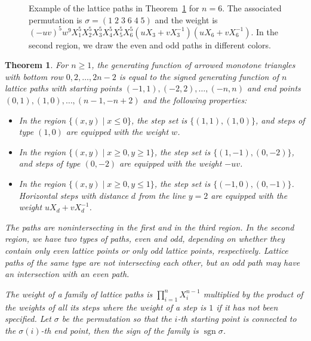 \documentclass[12pt]{amsart}
\newtheorem{theorem}{Theorem}[section]
\theoremstyle{definition}
\numberwithin{equation}{section}
\DeclareMathOperator{\sgn}{sgn}
\begin{document}
\begin{figure}[htb]
	\caption{Example of the lattice paths in Theorem~\ref{interpret1} for $n=6$. The associated permutation is $\sigma = (1\;2\;3\;6\;4\;5)$ and the weight is $(-u v)^5 w^9 \allowbreak X_1^5 X_2^5 X_3^5 X_4^5 X_5^5 X_6^5(u X_3+v X_3^{-1}) (u X_6 + v X_6^{-1})$. In the second region, we draw the even and odd paths in different colors.}
	\label{fig:ExampleFirstInterpretation}
\end{figure}




\begin{theorem} 
\label{interpret1} 
For $n \ge 1$, the generating function of arrowed monotone triangles with bottom row 
$0,2,\ldots,2n-2$ is equal to the signed generating function of $n$ lattice paths with starting points 
$(-1,1),(-2,2),\ldots,(-n,n)$ and end points $(0,1),(1,0),\ldots,(n-1,-n+2)$ and the following properties:
\begin{itemize} 
\item In the region $\{(x,y) \mid x \le 0\}$, the step set is $\{(1,1),(1,0)\}$, and steps of type $(1,0)$ are equipped with the weight $w$. 
\item In the region $\{(x,y) \mid  x \ge 0, y \ge 1\}$, the step set is $\{(1,-1),(0,-2)\}$, and steps of type $(0,-2)$  are equipped with the weight $-uv$. 
\item 
In the region $\{(x,y) \mid  x \ge 0, y \le 1\}$, the step set is $\{(-1,0),(0,-1)\}$. Horizontal steps with distance $d$ from the line $y=2$ are equipped with the weight $u X_d+v X_d^{-1}$. 
\end{itemize} 
The paths are nonintersecting in the first and in the third region. In the second region, we have two types of paths, 
even and odd, depending on whether they contain only even lattice points or only odd lattice points, respectively. Lattice paths of the same type are not intersecting each other, but an odd path may have an intersection with an even path. 

The weight of a family of lattice paths is $\prod_{i=1}^{n} X_i^{n-1}$ multiplied by the product of the weights of all its steps where the weight of a step is $1$ if it has not been specified.
Let $\sigma$ be the permutation so that the $i$-th starting point is connected to the $\sigma(i)$-th end point, then the sign of the family is $\sgn \sigma$. 
\end{theorem} 
\end{document}
